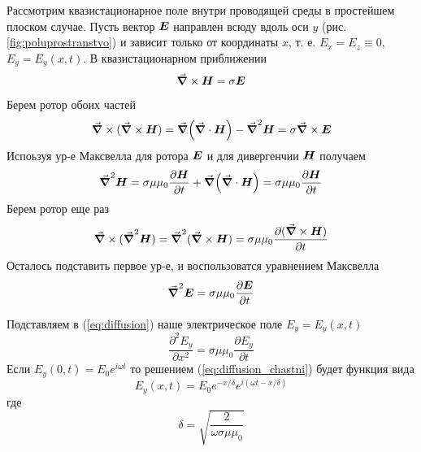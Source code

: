 \documentclass{article}
\begin{document}
Рассмотрим квазистационарное поле внутри проводящей среды в простейшем плоском случае.
Пусть вектор $\vb*{E}$ направлен всюду вдоль оси $y$ (рис.\ref{fig:poluprostranstvo}) 
и зависит только от координаты $x$, т. е. ${E_x} = {E_z} \equiv 0$, $E_y=E_y(x,t)$.
В квазистационарном приближении 
\begin{equation*}
    \grad \times \vb*{H} = \sigma \vb*{E}
\end{equation*}
Берем ротор обоих частей
\begin{equation*}
    \grad \times (\grad \times \vb*{H}) = \grad(\grad \cdot \vb*{H}) - \grad^2\vb*{H} = \sigma \grad \times \vb*{E}
\end{equation*}
Испоьзуя ур-е Максвелла для ротора $\vb*{E}$ и для дивергенчии $\vb*{H}$ получаем
\begin{equation}
    \grad^2 \vb*{H} = \sigma\mu\mu_0\frac{\partial\vb*{H}}{\partial t} 
                      + \grad(\grad \cdot \vb*{H}) = \sigma\mu\mu_0\frac{\partial\vb*{H}}{\partial t} 
    \label{eq:laplacian_H}
\end{equation}
Берем ротор еще раз
\begin{equation*}
    \grad \times (\grad^2\vb*{H}) = \grad^2 (\grad \times \vb*{H}) =
    \sigma\mu\mu_0 \frac{\partial (\grad \times \vb*{H})}{\partial t}
\end{equation*}
Осталось подставить первое ур-е, и воспользоватся уравнением Максвелла
\begin{equation}
    \grad^2\vb*{E}=\sigma\mu\mu_0 \frac{\partial \vb*{E}}{\partial t}\label{eq:diffusion}
\end{equation}

Подставляем в (\ref{eq:diffusion}) наше электрическое поле $E_y=E_y(x,t)$
\begin{equation}
    \frac{\partial^2 E_y}{\partial x^2} = \sigma\mu\mu_0\frac{\partial E_y}{\partial t}
    \label{eq:diffusion_chastni}
\end{equation}
Если $E_y(0,t)=E_0 e^{i\omega t}$ то решением (\ref{eq:diffusion_chastni}) будет функция вида
\begin{equation}
    E_y(x,t)=E_0 e^{-x/\delta} e^{i(\omega t - x/\delta)}
    \label{eq:skin_effect_poluprostranstvo}
\end{equation}
где
\begin{equation}
    \delta = \sqrt{\frac{2}{\omega\sigma\mu\mu_0}}
    \label{eq:delta}
\end{equation}

\newpage
\end{document}
